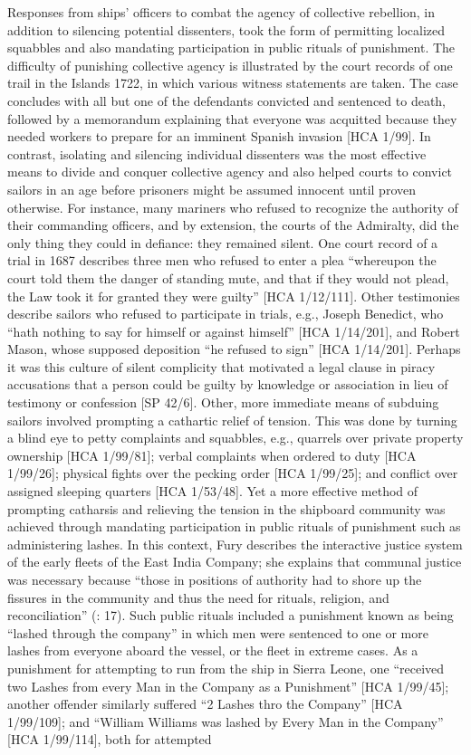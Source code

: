 Responses from ships' officers to combat the agency of collective rebellion, in addition to silencing potential dissenters, took the form of permitting localized squabbles and also mandating participation in public rituals of punishment. The difficulty of punishing collective agency is illustrated by the court records of one trail in the  Islands 1722, in which various witness statements are taken. The case concludes with all but one of the defendants convicted and sentenced to death, followed by a memorandum explaining that everyone was acquitted because they needed workers to prepare for an imminent Spanish invasion [HCA 1/99]. In contrast, isolating and silencing individual dissenters was the most effective means to divide and conquer collective agency and also helped courts to convict sailors in an age before prisoners might be assumed innocent until proven otherwise. For instance, many mariners who refused to recognize the authority of their commanding officers, and by extension, the courts of the Admiralty, did the only thing they could in defiance: they remained silent. One court record of a trial in 1687 describes three men who refused to enter a plea “whereupon the court told them the danger of standing mute, and that if they would not plead, the Law took it for granted they were guilty” [HCA 1/12/111]. Other testimonies describe sailors who refused to participate in trials, e.g., Joseph Benedict, who “hath nothing to say for himself or against himself” [HCA 1/14/201], and Robert Mason, whose supposed deposition “he refused to sign” [HCA 1/14/201]. Perhaps it was this culture of silent complicity that motivated a legal clause in piracy accusations that a person could be guilty by knowledge or association in lieu of testimony or confession [SP 42/6]. Other, more immediate means of subduing sailors involved prompting a cathartic relief of tension. This was done by turning a blind eye to petty complaints and squabbles, e.g., quarrels over private property ownership [HCA 1/99/81]; verbal complaints when ordered to duty [HCA 1/99/26]; physical fights over the pecking order [HCA 1/99/25]; and conflict over assigned sleeping quarters [HCA 1/53/48]. Yet a more effective method of prompting catharsis and relieving the tension in the shipboard community was achieved through mandating participation in public rituals of punishment such as administering lashes. In this context, Fury describes the interactive justice system of the early   fleets of the East India Company; she explains that communal justice was necessary because “those in positions of authority had to shore up the fissures in the community and thus the need for rituals, religion, and reconciliation” (\citealt{Fury2015}: 17). Such public rituals included a punishment known as being “lashed through the company” in which men were sentenced to one or more lashes from everyone aboard the vessel, or the fleet in extreme cases. As a punishment for attempting to run from the ship in Sierra Leone, one  “received two Lashes from every Man in the Company as a Punishment” [HCA 1/99/45]; another offender similarly suffered “2 Lashes thro the Company” [HCA 1/99/109]; and “William Williams was lashed by Every Man in the Company” [HCA 1/99/114], both for attempted 